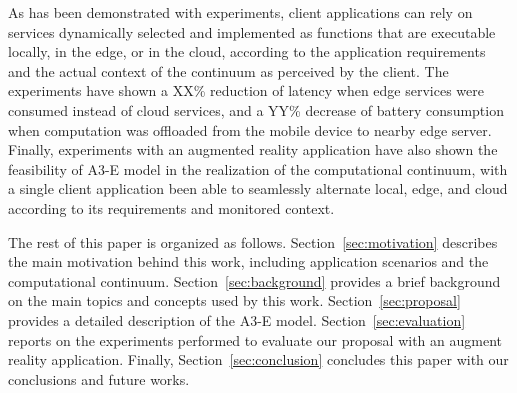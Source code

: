 As has been demonstrated with experiments, client applications can rely on services dynamically selected and implemented as functions that are executable locally, in the edge, or in the cloud, according to the application requirements and the actual context of the continuum as perceived by the client. The experiments have shown a XX\% reduction of latency when edge services were consumed instead of cloud services, and a YY\% decrease of battery consumption when computation was offloaded from the mobile device to nearby edge server. Finally, experiments with an augmented reality application have also shown the feasibility of A3-E model in the realization of the computational continuum, with a single client application been able to seamlessly alternate local, edge, and cloud according to its requirements and monitored context.



The rest of this paper is organized as follows. Section~\ref{sec:motivation} describes the main motivation behind this work, including application scenarios and the computational continuum. Section~\ref{sec:background} provides a brief background on the main topics and concepts used by this work. Section~\ref{sec:proposal} provides a detailed description of the A3-E model. Section~\ref{sec:evaluation} reports on the experiments performed to evaluate our proposal with an augment reality application. Finally, Section~\ref{sec:conclusion} concludes this paper with our conclusions and future works.




